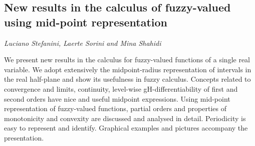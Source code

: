 \documentclass[../booklet.tex]{subfiles}
\begin{document}
\subsection[New results in the calculus of fuzzy-valued using mid-point representation. {\it Luciano Stefanini, Laerte Sorini and Mina Shahidi}]{New results in the calculus of fuzzy-valued using mid-point representation}
  

\begin{center}
  {\it Luciano Stefanini, Laerte Sorini and Mina Shahidi}
\end{center}




	We present new results in the calculus for fuzzy-valued functions of a
	single real variable. We adopt extensively the midpoint-radius
	representation of intervals in the real half-plane and show its usefulness
	in fuzzy calculus. Concepts related to convergence and limits, continuity,
	level-wise gH-differentiability of first and second orders have nice and useful midpoint expressions.
	Using mid-point representation of fuzzy-valued functions, partial orders and properties of monotonicity and convexity are discussed and analysed in detail.  Periodicity is easy to represent and identify. Graphical examples and pictures accompany the presentation. 


\end{document}
